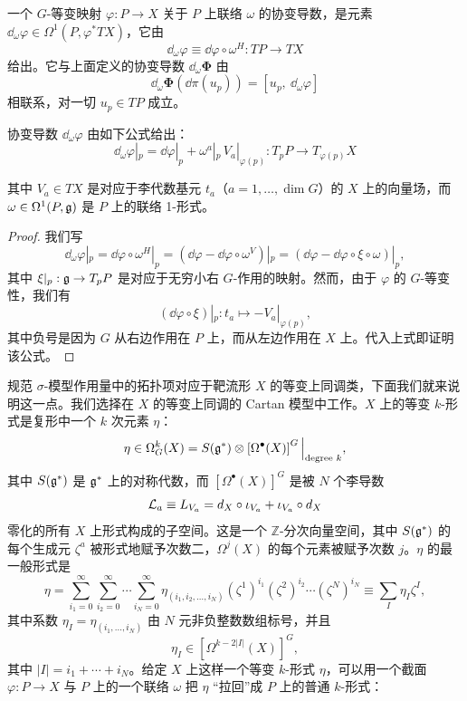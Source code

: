 \begin{definition}
一个 $G$-等变映射 $\varphi: P\to X$ 关于 $P$ 上联络 $\omega$ 的协变导数，是元素 $\dd_\omega\varphi\in\Omega^1(P,\varphi^*TX)$，它由
\[ \dd_\omega\varphi \equiv \dd\varphi\circ\omega^H: TP\to TX \]
给出。它与上面定义的协变导数 $\dd_\omega\bm{\Phi}$ 由
\[ \dd_\omega\bm{\Phi}(\dd\pi(u_p)) = [u_p,\ \dd_\omega\varphi] \]
相联系，对一切 $u_p\in TP$ 成立。
\end{definition}

\begin{theorem}
协变导数 $\dd_\omega\varphi$ 由如下公式给出：
\[
    \dd_\omega\varphi|_p = \dd\varphi|_p + \omega^a|_p\, V_a|_{\varphi(p)}: T_pP\to T_{\varphi(p)}X
\]
\end{theorem}

其中 $V_a\in TX$ 是对应于李代数基元 $t_a$（$a=1,\dots,\dim G$）的 $X$ 上的向量场，而 $\omega\in\Omega^1(P,\mathfrak{g})$ 是 $P$ 上的联络 1-形式。

\begin{proof}
我们写
\[
    \dd_\omega\varphi|_p = \dd\varphi\circ\omega^H|_p = (\dd\varphi-\dd\varphi\circ\omega^V)|_p = (\dd\varphi-\dd\varphi\circ\xi\circ\omega)|_p,
\]
其中 $\xi|_p: \mathfrak{g}\to T_pP$ 是对应于无穷小右 $G$-作用的映射。然而，由于 $\varphi$ 的 $G$-等变性，我们有
\[ (\dd\varphi\circ\xi)|_p: t_a \longmapsto -V_a|_{\varphi(p)}, \]
其中负号是因为 $G$ 从右边作用在 $P$ 上，而从左边作用在 $X$ 上。代入上式即证明该公式。
\end{proof}


规范 $\sigma$-模型作用量中的拓扑项对应于靶流形 $X$ 的等变上同调类，下面我们就来说明这一点。我们选择在 $X$ 的等变上同调的 Cartan 模型中工作。$X$ 上的等变 $k$-形式是复形中一个 $k$ 次元素 $\eta$：
\[
    \eta\in\Omega^k_G(X) = S(\mathfrak{g}^*)\otimes\left[\Omega^\bullet(X)\right]^G\Big|_{\text{degree }k},
\]
其中 $S(\mathfrak{g}^*)$ 是 $\mathfrak{g}^*$ 上的对称代数，而 $\left[\Omega^\bullet(X)\right]^G$ 是被 $N$ 个李导数
\[ \mathcal{L}_a \equiv L_{V_a} = d_X\circ\iota_{V_a} + \iota_{V_a}\circ d_X \]
零化的所有 $X$ 上形式构成的子空间。这是一个 $\mathbb{Z}$-分次向量空间，其中 $S(\mathfrak{g}^*)$ 的每个生成元 $\zeta^a$ 被形式地赋予次数二，$\Omega^j(X)$ 的每个元素被赋予次数 $j$。$\eta$ 的最一般形式是
\[
    \eta = \sum_{i_1=0}^\infty\sum_{i_2=0}^\infty\cdots\sum_{i_N=0}^\infty
    \eta_{(i_1,i_2,\dots,i_N)}(\zeta^1)^{i_1}(\zeta^2)^{i_2}\cdots(\zeta^N)^{i_N}
    \equiv \sum_I \eta_I\zeta^I,
\]
其中系数 $\eta_I=\eta_{(i_1,\dots,i_N)}$ 由 $N$ 元非负整数数组标号，并且
\[ \eta_I\in\left[\Omega^{k-2|I|}(X)\right]^G, \]
其中 $|I| = i_1+\cdots+i_N$。给定 $X$ 上这样一个等变 $k$-形式 $\eta$，可以用一个截面 $\varphi: P\to X$ 与 $P$ 上的一个联络 $\omega$ 把 $\eta$ “拉回”成 $P$ 上的普通 $k$-形式：

